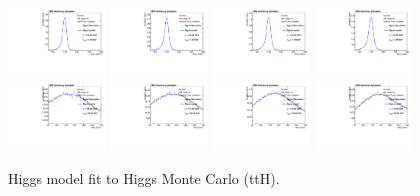 \begin{figure}[h]
  \centering
\includegraphics[width=0.23\textwidth]{figures/sec-signals/HiggsShapes/tth_HM_signal_fit_mgg_cat0.pdf}
\includegraphics[width=0.23\textwidth]{figures/sec-signals/HiggsShapes/tth_HM_signal_fit_mgg_cat1.pdf}
\includegraphics[width=0.23\textwidth]{figures/sec-signals/HiggsShapes/tth_LM_signal_fit_mgg_cat0.pdf}
\includegraphics[width=0.23\textwidth]{figures/sec-signals/HiggsShapes/tth_LM_signal_fit_mgg_cat1.pdf}
\includegraphics[width=0.23\textwidth]{figures/sec-signals/HiggsShapes/tth_HM_signal_fit_mjj_cat0.pdf}
\includegraphics[width=0.23\textwidth]{figures/sec-signals/HiggsShapes/tth_HM_signal_fit_mjj_cat1.pdf}
\includegraphics[width=0.23\textwidth]{figures/sec-signals/HiggsShapes/tth_LM_signal_fit_mjj_cat0.pdf}
\includegraphics[width=0.23\textwidth]{figures/sec-signals/HiggsShapes/tth_LM_signal_fit_mjj_cat1.pdf}
  \caption{Higgs model fit to Higgs Monte Carlo (ttH).}
  \label{fig:higgs_fit_tth}
\end{figure}




